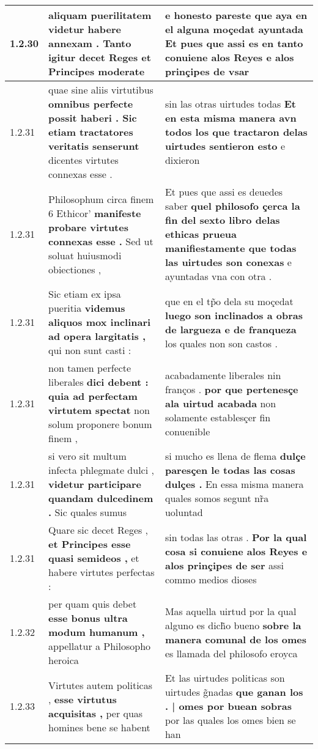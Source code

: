 \begin{tabular}{|p{1cm}|p{6.5cm}|p{6.5cm}|}
1.2.30 & aliquam puerilitatem videtur \textbf{ habere annexam . } Tanto igitur decet Reges et Principes moderate & e honesto pareste \textbf{ que aya en el alguna moçedat ayuntada Et pues que assi es en tanto conuiene alos Reyes } e alos prinçipes de vsar \\\hline
1.2.31 & quae sine aliis virtutibus \textbf{ omnibus perfecte possit haberi . Sic etiam tractatores veritatis senserunt } dicentes virtutes connexas esse . & sin las otras uirtudes todas \textbf{ Et en esta misma manera avn todos los que tractaron delas uirtudes sentieron esto } e dixieron \\\hline
1.2.31 & Philosophum circa finem 6 Ethicor’ \textbf{ manifeste probare virtutes connexas esse . } Sed ut soluat huiusmodi obiectiones , & Et pues que assi es deuedes saber \textbf{ quel philosofo çerca la fin del sexto libro delas ethicas prueua manifiestamente que todas las uirtudes son conexas } e ayuntadas vna con otra . \\\hline
1.2.31 & Sic etiam ex ipsa pueritia \textbf{ videmus aliquos mox inclinari ad opera largitatis , } qui non sunt casti : & que en el tp̃o dela su moçedat \textbf{ luego son inclinados a obras de largueza e de franqueza } los quales non son castos . \\\hline
1.2.31 & non tamen perfecte liberales \textbf{ dici debent : quia ad perfectam virtutem spectat } non solum proponere bonum finem , & acabadamente liberales nin franços . \textbf{ por que pertenesçe ala uirtud acabada } non solamente establesçer fin conuenible \\\hline
1.2.31 & si vero sit multum infecta phlegmate dulci , \textbf{ videtur participare quandam dulcedinem . } Sic quales sumus & si mucho es llena de flema \textbf{ dulçe paresçen le todas las cosas dulçes . } En essa misma manera quales somos segunt nr̃a uoluntad \\\hline
1.2.31 & Quare sic decet Reges , \textbf{ et Principes esse quasi semideos , } et habere virtutes perfectas : & sin todas las otras . \textbf{ Por la qual cosa si conuiene alos Reyes e alos prinçipes de ser } assi commo medios dioses \\\hline
1.2.32 & per quam quis debet \textbf{ esse bonus ultra modum humanum , } appellatur a Philosopho heroica & Mas aquella uirtud por la qual alguno es dich̃o bueno \textbf{ sobre la manera comunal de los omes } es llamada del philosofo eroyca \\\hline
1.2.33 & Virtutes autem politicas , \textbf{ esse virtutus acquisitas , } per quas homines bene se habent & Et las uirtudes politicas son uirtudes g̃nadas \textbf{ que ganan los . | omes por buean sobras } por las quales los omes bien se han \\\hline

\end{tabular}
